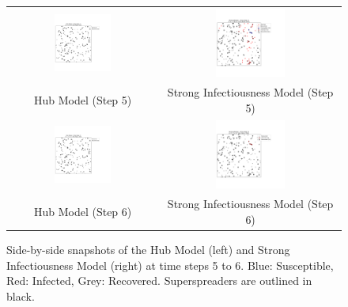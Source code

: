 \documentclass{article}
\begin{document}
\begin{figure}[!htbp]
    \centering
    \begin{tabular}{cc}
        \includegraphics[width=0.4\textwidth]{fig/sir_hub_step_5.png} &
        \includegraphics[width=0.4\textwidth]{fig/sir_strong_step_5.png} \\
        Hub Model (Step 5) & Strong Infectiousness Model (Step 5) \\
        \includegraphics[width=0.4\textwidth]{fig/sir_hub_step_6.png} &
        \includegraphics[width=0.4\textwidth]{fig/sir_strong_step_6.png} \\
        Hub Model (Step 6) & Strong Infectiousness Model (Step 6) \\
    \end{tabular}
    \caption{Side-by-side snapshots of the Hub Model (left) and Strong Infectiousness Model (right) at time steps 5 to 6. Blue: Susceptible, Red: Infected, Grey: Recovered. Superspreaders are outlined in black.}
    \label{fig:side_by_side_snapshots_3}
\end{figure}
\end{document}

